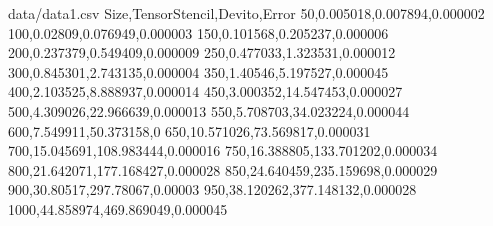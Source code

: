 \begin{filecontents*}{data/data1.csv}
	Size,TensorStencil,Devito,Error
	50,0.005018,0.007894,0.000002
	100,0.02809,0.076949,0.000003
	150,0.101568,0.205237,0.000006
	200,0.237379,0.549409,0.000009
	250,0.477033,1.323531,0.000012
	300,0.845301,2.743135,0.000004
	350,1.40546,5.197527,0.000045
	400,2.103525,8.888937,0.000014
	450,3.000352,14.547453,0.000027
	500,4.309026,22.966639,0.000013
	550,5.708703,34.023224,0.000044
	600,7.549911,50.373158,0
	650,10.571026,73.569817,0.000031
	700,15.045691,108.983444,0.000016
	750,16.388805,133.701202,0.000034
	800,21.642071,177.168427,0.000028
	850,24.640459,235.159698,0.000029
	900,30.80517,297.78067,0.00003
	950,38.120262,377.148132,0.000028
	1000,44.858974,469.869049,0.000045
\end{filecontents*}


